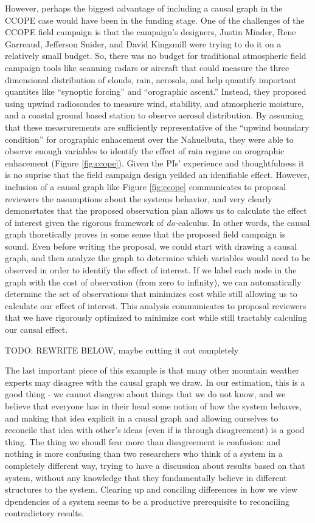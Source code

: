 \documentclass[12pt]{article}
\begin{document}
However, perhaps the biggest advantage of including a causal graph in
the CCOPE case would have been in the funding stage. One of the
challenges of the CCOPE field campaign is that the campaign's
designers, Justin Minder, Rene Garreaud, Jefferson Snider, and David
Kingsmill were trying to do it on a relatively small budget. So, there
was no budget for traditional atmospheric field campaign tools like
scanning radars or aircraft that could measure the three dimensional
distribution of clouds, rain, aerosols, and help quantify important
quantites like ``synoptic forcing'' and ``orographic ascent.''
Instead, they proposed using upwind radiosondes to measure wind,
stability, and atmospheric moisture, and a coastal ground based
station to observe aerosol distribution. By assuming that these
measrurements are sufficiently representative of the ``upwind boundary
condition'' for orographic enhacement over the Nahuelbuta, they were
able to observe enough variables to identify the effect of rain regime
on orographic enhacement (Figure \ref{fig:ccope}). Given the PIs'
experience and thoughtfulness it is no suprise that the field campaign
design yeilded an idenifiable effect. However, inclusion of a causal
graph like Figure \ref{fig:ccope} communicates to proposal reviewers
the assumptions about the systems behavior, and very clearly
demonsrtates that the proposed observation plan allows us to calculate
the effect of interest given the rigorous framework of
\textit{do-}calculus. In other words, the causal graph thoretically
proves in some sense that the proposed field campaign is sound. Even
before writing the proposal, we could start with drawing a causal
graph, and then analyze the graph to determine which variables would
need to be observed in order to identify the effect of interest. If we
label each node in the graph with the cost of observation (from zero
to infinity), we can automatically determine the set of observations
that minimizes cost while still allowing us to calculate our effect of
interest. This analysis communicates to proposal reviewers that we
have rigorously optimized to minimize cost while still tractably
calculing our causal effect.

TODO: REWRITE BELOW, maybe cutting it out completely

The last important piece of this example is that many other mountain
weather experts may disagree with the causal graph we draw. In our
estimation, this is a good thing - we cannot disagree about things
that we do not know, and we believe that everyone has in their head
some notion of how the system behaves, and making that idea explicit
in a causal graph and allowing ourselves to reconcile that idea with
other's ideas (even if is through disagreement) is a good thing. The
thing we shoudl fear more than disagreement is confusion: and nothing
is more confusing than two researchers who think of a system in a
completely different way, trying to have a discussion about results
based on that system, without any knowledge that they fundamentally
believe in different structures to the system. Clearing up and
conciling differences in how we view dpendencies of a system seems to
be a productive prerequisite to reconciling contradictory results.
\end{document}
